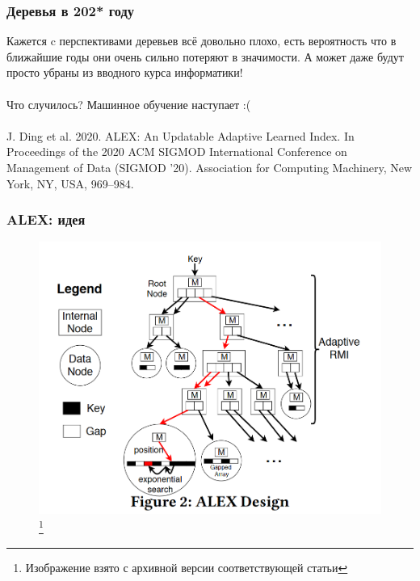 \documentclass{beamer}
\begin{document}
\begin{frame}
	\frametitle{Деревья в 202* году}
	
	Кажется c перспективами деревьев всё довольно плохо, есть вероятность что в ближайшие годы они очень сильно потеряют в значимости. А может даже будут просто убраны из вводного курса информатики!\\~\\
	
	Что случилось? Машинное обучение наступает :(\\~\\
	
	J. Ding et al. 2020. ALEX: An Updatable Adaptive Learned Index. In Proceedings of the 2020 ACM SIGMOD International Conference on Management of Data (SIGMOD '20). Association for Computing Machinery, New York, NY, USA, 969–984.
	
\end{frame}

\begin{frame}
	\frametitle{ALEX: идея}
	\begin{figure}[htb]
		\includegraphics[width=\textwidth,height=0.8\textheight,keepaspectratio]{alex-design.png} 
		\footnote{\tiny{Изображение взято с архивной версии соответствующей статьи}}
	\end{figure}	
	
\end{frame}
\end{document}
